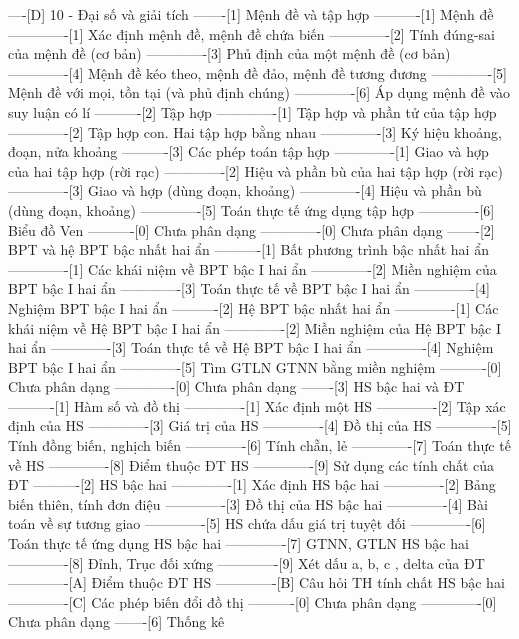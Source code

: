----[D] 10 - Đại số và giải tích
-------[1] Mệnh đề và tập hợp
----------[1] Mệnh đề
-------------[1] Xác định mệnh đề, mệnh đề chứa biến
-------------[2] Tính đúng-sai của mệnh đề (cơ bản)
-------------[3] Phủ định của một mệnh đề (cơ bản)
-------------[4] Mệnh đề kéo theo, mệnh đề đảo, mệnh đề tương đương
-------------[5] Mệnh đề với mọi, tồn tại (và phủ định chúng)
-------------[6] Áp dụng mệnh đề vào suy luận có lí
----------[2] Tập hợp
-------------[1] Tập hợp và phần tử của tập hợp
-------------[2] Tập hợp con. Hai tập hợp bằng nhau
-------------[3] Ký hiệu khoảng, đoạn, nửa khoảng
----------[3] Các phép toán tập hợp
-------------[1] Giao và hợp của hai tập hợp (rời rạc)
-------------[2] Hiệu và phần bù của hai tập hợp (rời rạc)
-------------[3] Giao và hợp (dùng đoạn, khoảng)
-------------[4] Hiệu và phần bù (dùng đoạn, khoảng)
-------------[5] Toán thực tế ứng dụng tập hợp
-------------[6] Biểu đồ Ven
----------[0] Chưa phân dạng
-------------[0] Chưa phân dạng
-------[2] BPT và hệ BPT bậc nhất hai ẩn
----------[1] Bất phương trình bậc nhất hai ẩn
-------------[1] Các khái niệm về BPT bậc I hai ẩn
-------------[2] Miền nghiệm của BPT bậc I hai ẩn
-------------[3] Toán thực tế về BPT bậc I hai ẩn
-------------[4] Nghiệm BPT bậc I hai ẩn
----------[2] Hệ BPT bậc nhất hai ẩn
-------------[1] Các khái niệm về Hệ BPT bậc I hai ẩn
-------------[2] Miền nghiệm của Hệ BPT bậc I hai ẩn
-------------[3] Toán thực tế về Hệ BPT bậc I hai ẩn
-------------[4] Nghiệm BPT bậc I hai ẩn
-------------[5] Tìm GTLN GTNN bằng miền nghiệm
----------[0] Chưa phân dạng
-------------[0] Chưa phân dạng
-------[3] HS bậc hai và ĐT
----------[1] Hàm số và đồ thị
-------------[1] Xác định một HS
-------------[2] Tập xác định của HS
-------------[3] Giá trị của HS
-------------[4] Đồ thị của HS
-------------[5] Tính đồng biến, nghịch biến
-------------[6] Tính chẵn, lẻ
-------------[7] Toán thực tế về HS
-------------[8] Điểm thuộc ĐT HS
-------------[9] Sử dụng các tính chất của ĐT
----------[2] HS bậc hai
-------------[1] Xác định HS bậc hai
-------------[2] Bảng biến thiên, tính đơn điệu
-------------[3] Đồ thị của HS bậc hai
-------------[4] Bài toán về sự tương giao
-------------[5] HS chứa dấu giá trị tuyệt đối
-------------[6] Toán thực tế ứng dụng HS bậc hai
-------------[7] GTNN, GTLN HS bậc hai
-------------[8] Đỉnh, Trục đối xứng
-------------[9] Xét dấu a, b, c , delta của ĐT
-------------[A] Điểm thuộc ĐT HS
-------------[B] Câu hỏi TH tính chất HS bậc hai
-------------[C] Các phép biến đổi đồ thị 
----------[0] Chưa phân dạng
-------------[0] Chưa phân dạng
-------[6] Thống kê
